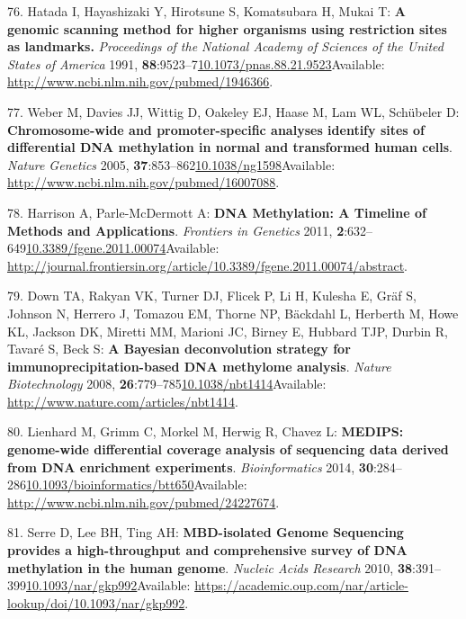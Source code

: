 \documentclass[
]{book}
\begin{document}
\leavevmode\hypertarget{ref-Hatada1991}{}%
76. Hatada I, Hayashizaki Y, Hirotsune S, Komatsubara H, Mukai T: \textbf{A genomic scanning method for higher organisms using restriction sites as landmarks.} \emph{Proceedings of the National Academy of Sciences of the United States of America} 1991, \textbf{88}:9523--7\href{https://doi.org/10.1073/pnas.88.21.9523}{10.1073/pnas.88.21.9523}Available: \url{http://www.ncbi.nlm.nih.gov/pubmed/1946366}.

\leavevmode\hypertarget{ref-Weber2005}{}%
77. Weber M, Davies JJ, Wittig D, Oakeley EJ, Haase M, Lam WL, Schübeler D: \textbf{Chromosome-wide and promoter-specific analyses identify sites of differential DNA methylation in normal and transformed human cells}. \emph{Nature Genetics} 2005, \textbf{37}:853--862\href{https://doi.org/10.1038/ng1598}{10.1038/ng1598}Available: \url{http://www.ncbi.nlm.nih.gov/pubmed/16007088}.

\leavevmode\hypertarget{ref-Harrison2011}{}%
78. Harrison A, Parle-McDermott A: \textbf{DNA Methylation: A Timeline of Methods and Applications}. \emph{Frontiers in Genetics} 2011, \textbf{2}:632--649\href{https://doi.org/10.3389/fgene.2011.00074}{10.3389/fgene.2011.00074}Available: \url{http://journal.frontiersin.org/article/10.3389/fgene.2011.00074/abstract}.

\leavevmode\hypertarget{ref-Down2009}{}%
79. Down TA, Rakyan VK, Turner DJ, Flicek P, Li H, Kulesha E, Gräf S, Johnson N, Herrero J, Tomazou EM, Thorne NP, Bäckdahl L, Herberth M, Howe KL, Jackson DK, Miretti MM, Marioni JC, Birney E, Hubbard TJP, Durbin R, Tavaré S, Beck S: \textbf{A Bayesian deconvolution strategy for immunoprecipitation-based DNA methylome analysis}. \emph{Nature Biotechnology} 2008, \textbf{26}:779--785\href{https://doi.org/10.1038/nbt1414}{10.1038/nbt1414}Available: \url{http://www.nature.com/articles/nbt1414}.

\leavevmode\hypertarget{ref-Lienhard2014}{}%
80. Lienhard M, Grimm C, Morkel M, Herwig R, Chavez L: \textbf{MEDIPS: genome-wide differential coverage analysis of sequencing data derived from DNA enrichment experiments}. \emph{Bioinformatics} 2014, \textbf{30}:284--286\href{https://doi.org/10.1093/bioinformatics/btt650}{10.1093/bioinformatics/btt650}Available: \url{http://www.ncbi.nlm.nih.gov/pubmed/24227674}.

\leavevmode\hypertarget{ref-Serre2009a}{}%
81. Serre D, Lee BH, Ting AH: \textbf{MBD-isolated Genome Sequencing provides a high-throughput and comprehensive survey of DNA methylation in the human genome}. \emph{Nucleic Acids Research} 2010, \textbf{38}:391--399\href{https://doi.org/10.1093/nar/gkp992}{10.1093/nar/gkp992}Available: \url{https://academic.oup.com/nar/article-lookup/doi/10.1093/nar/gkp992}.
\end{document}
